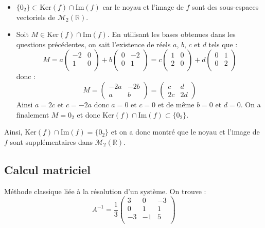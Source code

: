 \documentclass[a4paper,twoside,french,11pt]{VcCours}
\begin{document}
\begin{enumerate}
\begin{itemize}
\item $\lbrace 0_2 \rbrace \subset\textrm{Ker}(f) \cap \textrm{Im}(f)$ car le noyau et l'image de $f$ sont des sous-espaces vectoriels de $\mathcal{M}_2(\mathbb{R})$.
\item Soit $M \in \textrm{Ker}(f) \cap \textrm{Im}(f)$. En utilisant les bases obtenues dans les questions précédentes, on sait l'existence de réels $a$, $b$, $c$ et $d$ tels que :
$$ M = a \begin{pmatrix}
-2 & 0 \\
1 & 0 \\
\end{pmatrix} + b \begin{pmatrix}
0 & -2 \\
0 & 1 \\
\end{pmatrix} = c \begin{pmatrix}
1 & 0 \\
2 & 0 \\
\end{pmatrix} + d \begin{pmatrix}
0 & 1 \\
0 & 2 \\
\end{pmatrix}$$
donc :
$$ M = \begin{pmatrix}
-2a & -2b \\
a & b
\end{pmatrix} =\begin{pmatrix}
c & d \\
2c & 2d
\end{pmatrix}$$
Ainsi $a=2c$ et $c=-2a$ donc $a=0$ et $c=0$ et de même $b=0$ et $d=0$. On a finalement $M=0_2$ et donc $\textrm{Ker}(f) \cap \textrm{Im}(f) \subset \lbrace 0_2 \rbrace$.
\end{itemize}
Ainsi, $\textrm{Ker}(f) \cap \textrm{Im}(f) = \lbrace 0_2 \rbrace$ et on a donc montré que le noyau et l'image de $f$ sont supplémentaires dans $\mathcal{M}_2(\mathbb{R})$.
\end{enumerate}

\subsection{Calcul matriciel}

\begin{Exercice}{}\end{Exercice}Méthode classique liée à la résolution d'un système. On trouve :
$$ A^{-1} = \frac{1}{3} \begin{pmatrix}
3 & 0 & -3 \\
0 & 1 & 1 \\
-3 & -1 & 5 \\
\end{pmatrix}$$
\end{document}
